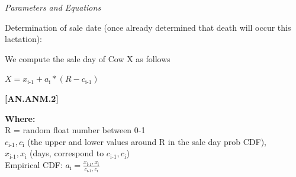 \documentclass{article}
\begin{document}
\begin{refsection}
\begin{enumerate}
\begin{itemize}
         \end{itemize}


         \textit{Parameters and Equations}
         \vspace{0.1cm}

        Determination of sale date (once already determined that death will occur this lactation): 
        \vspace{0.2cm}

        We compute the sale day of Cow X as follows
        \vspace{0.5cm}
        
        \begin{center}
            \(X = x_{\text{i-1}} + a_{\text{i}} * (R - c_{\text{i-1}})\)
        \end{center}
        \vspace{0.5cm}
            
                {\raggedleft \textbf{[AN.ANM.2]}\par}
        \vspace{0.25cm}

        \textbf{Where:} \\

        \hspace*{1.5em} R = random float number between 0-1  \\

        \hspace*{1.5em} $c_{\text{i-1}},c_{\text{i}}$ (the upper and lower values around R in the sale day prob CDF),  \\

        \hspace*{1.5em} $x_{\text{i-1}},x_{\text{i}}$ (days, correspond to $c_{\text{i-1}},c_{\text{i}}$) \\

        \hspace*{1.5em} Empirical CDF: $a_{\text{i}} = \frac{x_{\text{i-1}},x_{\text{i}}}{c_{\text{i-1}},c_{\text{i}}}$ \\


\end{enumerate}
\end{refsection}
\end{document}

